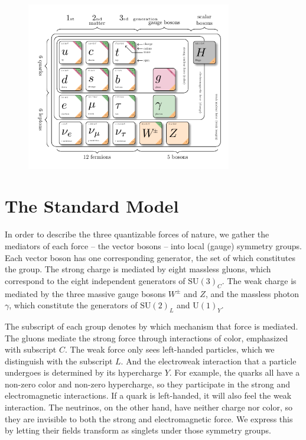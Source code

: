 \begin{figure}[!h]
    \centering
    \includegraphics[width=0.8\textwidth]{figures/SM_figure.pdf}
\end{figure}
\section{The Standard Model}\label{ch:SM}
In order to describe the three quantizable forces of nature, we gather the mediators of each force -- the vector bosons -- into local (gauge) symmetry groups. 
Each vector boson has one corresponding generator, the set of which constitutes the group.
The strong charge is mediated by eight massless gluons, which correspond to the eight independent generators of $\text{SU}(3)_C$. 
The weak charge is mediated by the three massive gauge bosons $W^\pm$ and $Z$, and the massless photon $\gamma$, 
which constitute the generators of $\text{SU}(2)_L$ and $\text{U}(1)_Y$. 

The subscript of each group denotes by which mechanism that force is mediated. The gluons mediate the strong force through interactions of color,
emphasized with subscript $C$. The weak force only sees left-handed particles, 
which we distinguish with the subscript $L$. And the electroweak interaction that a particle undergoes is determined by its hypercharge $Y$. 
For example, the quarks all have a non-zero color and non-zero hypercharge, 
so they participate in the strong and electromagnetic interactions. If a quark is left-handed, it will also feel the weak interaction. 
The neutrinos, on the other hand, have neither charge nor color, 
so they are invisible to both the strong and electromagnetic force. We express this by letting their fields transform as singlets under those symmetry groups.

